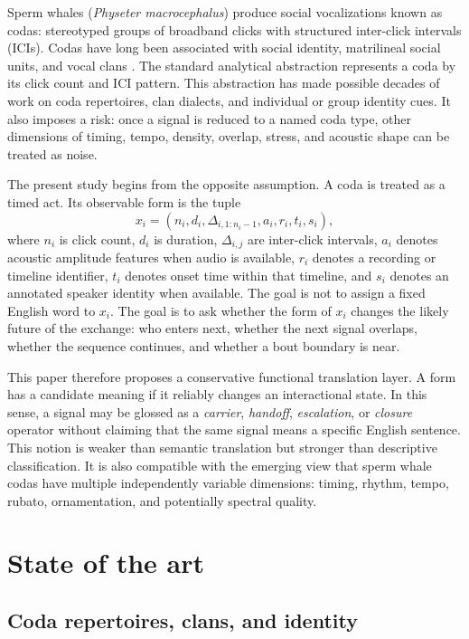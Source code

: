 \documentclass[11pt]{article}
\begin{document}
Sperm whales (\textit{Physeter macrocephalus}) produce social vocalizations known as codas: stereotyped groups of broadband clicks with structured inter-click intervals (ICIs). Codas have long been associated with social identity, matrilineal social units, and vocal clans \citep{rendell2003clans,gero2016identity,whitehead2003sperm}. The standard analytical abstraction represents a coda by its click count and ICI pattern. This abstraction has made possible decades of work on coda repertoires, clan dialects, and individual or group identity cues. It also imposes a risk: once a signal is reduced to a named coda type, other dimensions of timing, tempo, density, overlap, stress, and acoustic shape can be treated as noise.

The present study begins from the opposite assumption. A coda is treated as a timed act. Its observable form is the tuple
\begin{equation}
    x_i = (n_i, d_i, \Delta_{i,1:n_i-1}, a_i, r_i, t_i, s_i),
\end{equation}
where $n_i$ is click count, $d_i$ is duration, $\Delta_{i,j}$ are inter-click intervals, $a_i$ denotes acoustic amplitude features when audio is available, $r_i$ denotes a recording or timeline identifier, $t_i$ denotes onset time within that timeline, and $s_i$ denotes an annotated speaker identity when available. The goal is not to assign a fixed English word to $x_i$. The goal is to ask whether the form of $x_i$ changes the likely future of the exchange: who enters next, whether the next signal overlaps, whether the sequence continues, and whether a bout boundary is near.

This paper therefore proposes a conservative functional translation layer. A form has a candidate meaning if it reliably changes an interactional state. In this sense, a signal may be glossed as a \emph{carrier}, \emph{handoff}, \emph{escalation}, or \emph{closure} operator without claiming that the same signal means a specific English sentence. This notion is weaker than semantic translation but stronger than descriptive classification. It is also compatible with the emerging view that sperm whale codas have multiple independently variable dimensions: timing, rhythm, tempo, rubato, ornamentation, and potentially spectral quality.

\section{State of the art}

\subsection{Coda repertoires, clans, and identity}
\end{document}
